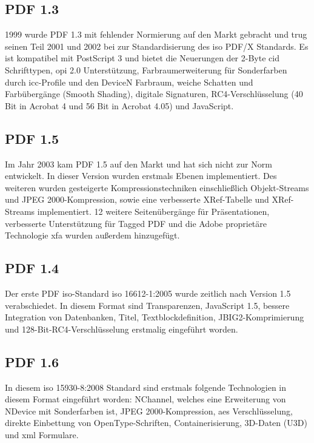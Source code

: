 \subsection{PDF 1.3}
1999 wurde PDF 1.3 mit fehlender Normierung auf den Markt gebracht und trug seinen Teil 2001 und 2002 bei zur Standardisierung des \gls{iso} PDF/X Standards. Es ist kompatibel mit PostScript 3 und bietet die Neuerungen der 2-Byte \gls{cid} Schrifttypen, \gls{opi} 2.0 Unterstützung, Farbraumerweiterung für Sonderfarben durch \gls{icc}-Profile und den DeviceN Farbraum, weiche Schatten und Farbübergänge (Smooth Shading), digitale Signaturen, RC4-Verschlüsselung (40 Bit in Acrobat 4 und 56 Bit in Acrobat 4.05) und JavaScript. \cite{proj-consult}


\subsection{PDF 1.5}
Im Jahr 2003 kam PDF 1.5 auf den Markt und hat sich nicht zur Norm entwickelt. In dieser Version wurden erstmals Ebenen implementiert. Des weiteren wurden gesteigerte Kompressionstechniken einschließlich Objekt-Streams und JPEG 2000-Kompression, sowie eine verbesserte XRef-Tabelle und XRef-Streams implementiert. 12 weitere Seitenübergänge für Präsentationen, verbesserte Unterstützung für Tagged PDF und die Adobe proprietäre Technologie \gls{xfa} wurden außerdem hinzugefügt. \cite{proj-consult} 

\subsection{PDF 1.4}
Der erste PDF \gls{iso}-Standard \gls{iso} 16612-1:2005 wurde zeitlich nach Version 1.5 verabschiedet. In diesem Format sind Transparenzen, JavaScript 1.5, bessere Integration von Datenbanken, Titel, Textblockdefinition, JBIG2-Komprimierung und 128-Bit-RC4-Verschlüsselung erstmalig eingeführt worden. \cite{proj-consult}

\subsection{PDF 1.6}
In diesem \gls{iso} 15930-8:2008 Standard sind erstmals folgende Technologien in diesem Format eingeführt worden: NChannel, welches eine Erweiterung von NDevice mit Sonderfarben ist, JPEG 2000-Kompression, \gls{aes} Verschlüsselung, direkte Einbettung von OpenType-Schriften, Containerisierung, 3D-Daten (U3D) und \gls{xml} Formulare. \cite{proj-consult}

